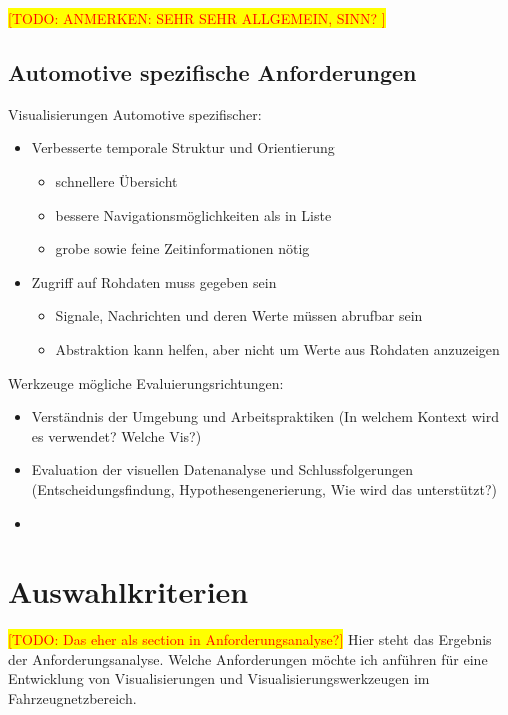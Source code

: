 \documentclass[draft=false
              ,paper=a4
              ,twoside=false
              ,fontsize=11pt
              ,headsepline
              ,BCOR10mm
              ,DIV11
              ]{scrbook}
\newcommand{\TODO}[1]{\colorbox{yellow}{\textcolor{red}{[TODO: #1]}}}
\begin{document}
\TODO{ANMERKEN: SEHR SEHR ALLGEMEIN, SINN? }


\section{Automotive spezifische Anforderungen} %
\label{sec:automotive_spezifische_anforderungen}
Visualisierungen Automotive spezifischer:

\begin{itemize}
  \item Verbesserte temporale Struktur und Orientierung
    \begin{itemize}
    \item schnellere Übersicht
    \item bessere Navigationsmöglichkeiten als in Liste
    \item grobe sowie feine Zeitinformationen nötig
  \end{itemize}
  \item Zugriff auf Rohdaten muss gegeben sein
  \begin{itemize}
    \item Signale, Nachrichten und deren Werte müssen abrufbar sein
    \item Abstraktion kann helfen, aber nicht um Werte aus Rohdaten anzuzeigen
  \end{itemize}
\end{itemize}

Werkzeuge mögliche Evaluierungsrichtungen:

\begin{itemize}
  \item Verständnis der Umgebung und Arbeitspraktiken (In welchem Kontext wird es verwendet? Welche Vis?)
  \item Evaluation der visuellen Datenanalyse und Schlussfolgerungen (Entscheidungsfindung, Hypothesengenerierung, Wie wird das unterstützt?)
  \item 
\end{itemize}

\chapter{Auswahlkriterien} %
\label{cha:auswahlkriterien}
\TODO{Das eher als section in Anforderungsanalyse?}
Hier steht das Ergebnis der Anforderungsanalyse. Welche Anforderungen möchte ich anführen für eine Entwicklung von Visualisierungen und Visualisierungswerkzeugen im Fahrzeugnetzbereich.
\end{document}
